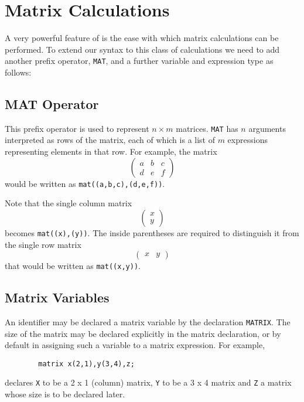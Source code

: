 \chapter{Matrix Calculations} 
A very powerful feature of {\REDUCE} is the ease with which matrix
calculations can be performed. To extend our syntax to this class of
calculations we need to add another prefix operator, \texttt{MAT},
 and a further
variable and expression type as follows:

\section{MAT Operator}
\hypertarget{operator:MAT}{}
This prefix operator is used to represent $n\times m$ matrices. \texttt{MAT} 
has $n$ arguments interpreted as rows of the matrix, each of
which is a list of $m$ expressions representing elements in that row.
For example, the matrix
\[ \left( \begin{array}{lcr} a & b & c \\ d & e & f \end{array} \right) \]
would be written as \texttt{mat((a,b,c),(d,e,f))}.

Note that the single column matrix
\[ \left( \begin{array}{c} x \\ y \end{array} \right) \]
becomes \texttt{mat((x),(y))}.  The inside parentheses are required to
distinguish it from the single row matrix
\[ \left( \begin{array}{lr} x & y \end{array} \right) \]
that would be written as \texttt{mat((x,y))}.

\section{Matrix Variables}
\hypertarget{command:MATRIX}{}

An identifier may be declared a matrix variable by the declaration 
\texttt{MATRIX}.
The size of the matrix may be declared explicitly in the matrix
declaration, or by default in assigning such a variable to a matrix
expression. For example,
\begin{verbatim}
        matrix x(2,1),y(3,4),z;
\end{verbatim}
declares \texttt{X} to be a 2 x 1 (column) matrix, \texttt{Y} to be a 3 x 4
matrix and \texttt{Z} a matrix whose size is to be declared later.

